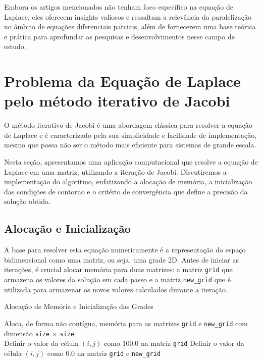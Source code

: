\documentclass[conference]{IEEEtran}
\begin{document}
Embora os artigos mencionados não tenham foco específico na equação de Laplace, eles oferecem insights valiosos e ressaltam a relevância da paralelização no âmbito de equações diferenciais parciais, além de fornecerem uma base teórica e prática para aprofundar as pesquisas e desenvolvimentos nesse campo de estudo.

\section{Problema da Equação de Laplace pelo método iterativo de Jacobi}

O método iterativo de Jacobi é uma abordagem clássica para resolver a equação de Laplace e é caracterizado pela sua simplicidade e facilidade de implementação, mesmo que possa não ser o método mais eficiente para sistemas de grande escala.

Nesta seção, apresentamos uma aplicação computacional que resolve a equação de Laplace em uma matriz, utilizando a iteração de Jacobi. Discutiremos a implementação do algoritmo, enfatizando a alocação de memória, a inicialização das condições de contorno e o critério de convergência que define a precisão da solução obtida.

\subsection{Alocação e Inicialização}

A base para resolver esta equação numericamente é a representação do espaço bidimensional como uma matriz, ou seja, uma grade 2D. Antes de iniciar as iterações, é crucial alocar memória para duas matrizes: a matriz \texttt{grid} que armazena os valores da solução em cada passo e a matriz \texttt{new\_grid} que é utilizada para armazenar os novos valores calculados durante a iteração.

\begin{algorithm}[H]
    \caption{Alocação de Memória e Inicialização das Grades}
    \begin{algorithmic}[1]
        \State Aloca, de forma não contígua, memória para as matrizes \texttt{grid} e \texttt{new\_grid} com dimensão \texttt{size} \(\times\) \texttt{size}
        \EndFunction
        \\
        \State Definir o valor da célula $(i, j)$ como 100.0 na matriz
        \texttt{grid}
        \Else
        \State Definir o valor da célula $(i, j)$ como 0.0 na matriz \texttt{grid} e \texttt{new\_grid}
        \EndIf
        \EndFor
        \EndFunction
    \end{algorithmic}
\end{algorithm}
\end{document}
